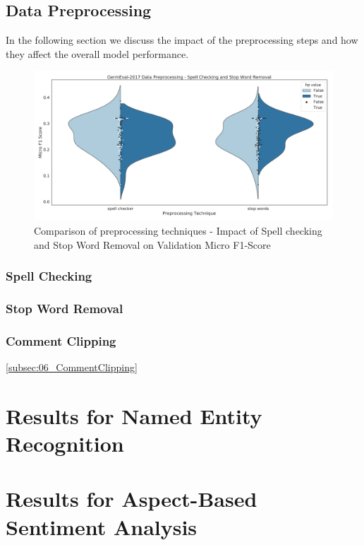 \subsection{Data Preprocessing}
\label{subsec:06_dataPreprocessing}
In the following section we discuss the impact of the preprocessing steps and how they affect the overall model performance. 


\begin{figure}[ht]
	\centering
	\includegraphics[width=\textwidth]{figures/06_results/06_hp_ge_vio_data}
	\caption{Comparison of preprocessing techniques - Impact of Spell checking and Stop Word Removal on Validation Micro F1-Score}
	\label{fig:06_PreprocessingHp}
\end{figure}

\subsubsection{Spell Checking}

\subsubsection{Stop Word Removal}

\subsubsection{Comment Clipping}
\ref{subsec:06_CommentClipping}


\section{Results for Named Entity Recognition}

\section{Results for Aspect-Based Sentiment Analysis}


